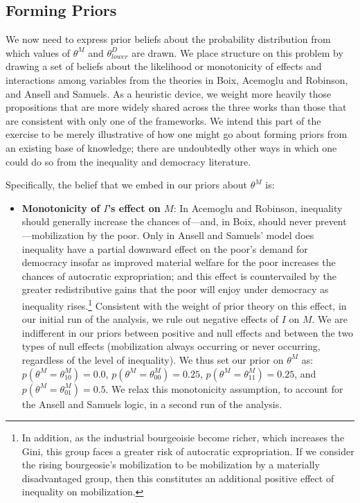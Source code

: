 \documentclass[12pt,]{book}
\providecommand{\tightlist}{%
  \setlength{\itemsep}{0pt}\setlength{\parskip}{0pt}}
\let\rmarkdownfootnote\footnote%
\def\footnote{\protect\rmarkdownfootnote}
\begin{document}
\hypertarget{forming-priors}{%
\subsection{Forming Priors}\label{forming-priors}}

We now need to express prior beliefs about the probability distribution from which values of \(\theta^M\) and \(\theta^D_{lower}\) are drawn. We place structure on this problem by drawing a set of beliefs about the likelihood or monotonicity of effects and interactions among variables from the theories in Boix, Acemoglu and Robinson, and Ansell and Samuels. As a heuristic device, we weight more heavily those propositions that are more widely shared across the three works than those that are consistent with only one of the frameworks. We intend this part of the exercise to be merely illustrative of how one might go about forming priors from an existing base of knowledge; there are undoubtedly other ways in which one could do so from the inequality and democracy literature.

Specifically, the belief that we embed in our priors about \(\theta^M\) is:

\begin{itemize}
\tightlist
\item
  \textbf{Monotonicity of \(I\)'s effect on \(M\)}: In Acemoglu and Robinson, inequality should generally increase the chances of---and, in Boix, should never prevent---mobilization by the poor. Only in Ansell and Samuels' model does inequality have a partial downward effect on the poor's demand for democracy insofar as improved material welfare for the poor increases the chances of autocratic expropriation; and this effect is countervailed by the greater redistributive gains that the poor will enjoy under democracy as inequality rises.\footnote{In addition, as the industrial bourgeoisie become richer, which increases the Gini, this group faces a greater risk of autocratic expropriation. If we consider the rising bourgeosie's mobilization to be mobilization by a materially disadvantaged group, then this constitutes an additional positive effect of inequality on mobilization.} Consistent with the weight of prior theory on this effect, in our initial run of the analysis, we rule out negative effects of \(I\) on \(M\). We are indifferent in our priors between positive and null effects and between the two types of null effects (mobilization always occurring or never occurring, regardless of the level of inequality). We thus set our prior on \(\theta^M\) as: \(p(\theta^M=\theta^M_{10})=0.0\), \(p(\theta^M=\theta^M_{00})=0.25\), \(p(\theta^M=\theta^M_{11})=0.25\), and \(p(\theta^M=\theta^M_{01})=0.5\). We relax this monotonicity assumption, to account for the Ansell and Samuels logic, in a second run of the analysis.
\end{itemize}
\end{document}

